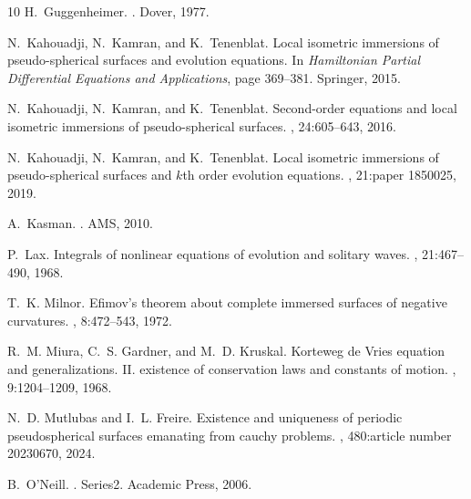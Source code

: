 \documentclass{cimart}
\begin{document}
{\begin{thebibliography}{10}
        H.~Guggenheimer.
        .
        \newblock Dover, 1977.
        
        N.~Kahouadji, N.~Kamran, and K.~Tenenblat.
        \newblock Local isometric immersions of pseudo-spherical surfaces and evolution
          equations.
        \newblock In {\em Hamiltonian Partial Differential Equations and Applications},
          page 369–381. Springer, 2015.
        
        N.~Kahouadji, N.~Kamran, and K.~Tenenblat.
        \newblock Second-order equations and local isometric immersions of
          pseudo-spherical surfaces.
        , 24:605--643, 2016.
        
        N.~Kahouadji, N.~Kamran, and K.~Tenenblat.
        \newblock Local isometric immersions of pseudo-spherical surfaces and $k$th
          order evolution equations.
        , 21:paper 1850025, 2019.
        
        A.~Kasman.
        .
        \newblock AMS, 2010.
        
        P.~Lax.
        \newblock Integrals of nonlinear equations of evolution and solitary waves.
        , 21:467--490, 1968.
        
        T.~K. Milnor.
        \newblock Efimov's theorem about complete immersed surfaces of negative
          curvatures.
        , 8:472--543, 1972.
        
        R.~M. Miura, C.~S. Gardner, and M.~D. Kruskal.
        \newblock Korteweg de {V}ries equation and generalizations. {II}. existence of
          conservation laws and constants of motion.
        , 9:1204--1209, 1968.
        
        N.~D. Mutlubas and I.~L. Freire.
        \newblock Existence and uniqueness of periodic pseudospherical surfaces
          emanating from cauchy problems.
        , 480:article number
          20230670, 2024.
        
        B.~O'Neill.
        .
        \newblock Series2. Academic Press, 2006.
        

\end{thebibliography}}
\end{document}
